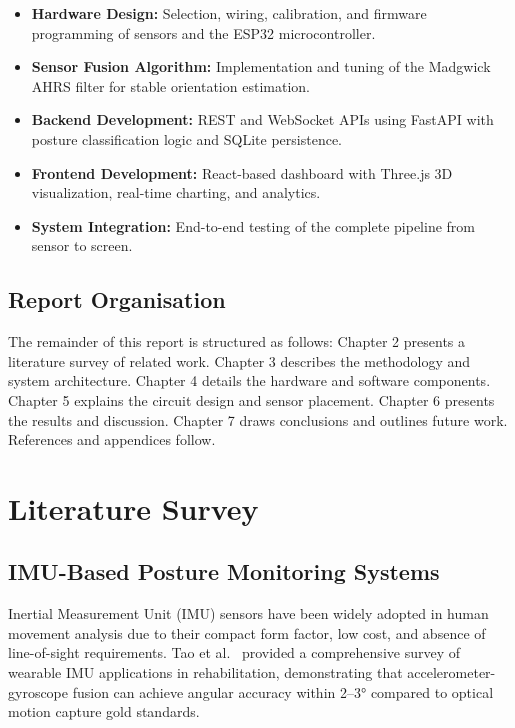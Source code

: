 \documentclass[12pt,a4paper]{report}
\begin{document}
\begin{itemize}[leftmargin=2em]
    \item \textbf{Hardware Design:} Selection, wiring, calibration, and firmware programming of sensors and the ESP32 microcontroller.
    \item \textbf{Sensor Fusion Algorithm:} Implementation and tuning of the Madgwick AHRS filter for stable orientation estimation.
    \item \textbf{Backend Development:} REST and WebSocket APIs using FastAPI with posture classification logic and SQLite persistence.
    \item \textbf{Frontend Development:} React-based dashboard with Three.js 3D visualization, real-time charting, and analytics.
    \item \textbf{System Integration:} End-to-end testing of the complete pipeline from sensor to screen.
\end{itemize}

\section{Report Organisation}

The remainder of this report is structured as follows: Chapter 2 presents a literature survey of related work. Chapter 3 describes the methodology and system architecture. Chapter 4 details the hardware and software components. Chapter 5 explains the circuit design and sensor placement. Chapter 6 presents the results and discussion. Chapter 7 draws conclusions and outlines future work. References and appendices follow.


\chapter{Literature Survey}

\section{IMU-Based Posture Monitoring Systems}

Inertial Measurement Unit (IMU) sensors have been widely adopted in human movement analysis due to their compact form factor, low cost, and absence of line-of-sight requirements. Tao et al.\ \cite{tao2012} provided a comprehensive survey of wearable IMU applications in rehabilitation, demonstrating that accelerometer-gyroscope fusion can achieve angular accuracy within 2--3° compared to optical motion capture gold standards.
\end{document}
